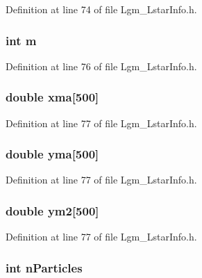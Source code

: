 Definition at line 74 of file Lgm\_\-LstarInfo.h.\hypertarget{struct_lgm___lstar_info_742204794ea328ba293fe59cec79b990}{
\subsubsection[{m}]{\setlength{\rightskip}{0pt plus 5cm}int {\bf m}}}
\label{struct_lgm___lstar_info_742204794ea328ba293fe59cec79b990}




Definition at line 76 of file Lgm\_\-LstarInfo.h.\hypertarget{struct_lgm___lstar_info_7b60b67e8a8714de350f686c14a6866e}{
\subsubsection[{xma}]{\setlength{\rightskip}{0pt plus 5cm}double {\bf xma}\mbox{[}500\mbox{]}}}
\label{struct_lgm___lstar_info_7b60b67e8a8714de350f686c14a6866e}




Definition at line 77 of file Lgm\_\-LstarInfo.h.\hypertarget{struct_lgm___lstar_info_911c5b5fff6eb68546281d9a63610f81}{
\subsubsection[{yma}]{\setlength{\rightskip}{0pt plus 5cm}double {\bf yma}\mbox{[}500\mbox{]}}}
\label{struct_lgm___lstar_info_911c5b5fff6eb68546281d9a63610f81}




Definition at line 77 of file Lgm\_\-LstarInfo.h.\hypertarget{struct_lgm___lstar_info_33c7d04ab4147ef8853fb6621a6a7456}{
\subsubsection[{ym2}]{\setlength{\rightskip}{0pt plus 5cm}double {\bf ym2}\mbox{[}500\mbox{]}}}
\label{struct_lgm___lstar_info_33c7d04ab4147ef8853fb6621a6a7456}




Definition at line 77 of file Lgm\_\-LstarInfo.h.\hypertarget{struct_lgm___lstar_info_9e239b576529625f9b2f05c84b12b4a9}{
\subsubsection[{nParticles}]{\setlength{\rightskip}{0pt plus 5cm}int {\bf nParticles}}}
\label{struct_lgm___lstar_info_9e239b576529625f9b2f05c84b12b4a9}




